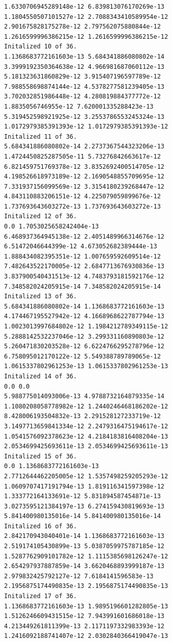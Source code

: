 \documentclass[11pt]{article}
\begin{document}
\begin{Verbatim}[commandchars=\\\{\}]
1.6330706945289148e-12 6.839813076170269e-13
1.1804550507101527e-12 2.7088343410589954e-12
2.901675828175278e-12 2.797562075880844e-12
1.2616599996386215e-12 1.2616599996386215e-12
Initalized 10 of 36.
1.1368683772161603e-13 5.684341886080802e-14
3.3999192350364638e-12 4.966981687060112e-13
5.181323631860829e-12 3.915407196597789e-12
7.988558698874144e-12 4.5378277581239405e-13
3.702032851986448e-12 4.280819884377772e-12
1.8835056746955e-12 7.620001335288423e-13
5.319452598921925e-12 3.2553786553245324e-13
1.0172979385391393e-12 1.0172979385391393e-12
Initalized 11 of 36.
5.684341886080802e-14 2.2737367544323206e-13
1.4724450825287505e-11 5.73276842663617e-12
6.821459751769378e-12 3.8352692400514705e-12
4.198526618973189e-12 2.1690548855709695e-12
7.331937156099569e-12 3.3154180239268447e-12
4.843110883206151e-12 4.225079059899676e-12
1.737693643603272e-13 1.737693643603272e-13
Initalized 12 of 36.
0.0 1.7053025658242404e-13
6.468937364945138e-12 2.4051489966314676e-12
6.51472046644399e-12 4.673052682389444e-13
1.888434082395351e-12 1.007659592609514e-12
7.482643522170005e-12 2.6847713676930836e-13
3.837900540431513e-12 4.7483793181592176e-12
7.348582024205915e-14 7.348582024205915e-14
Initalized 13 of 36.
5.684341886080802e-14 1.1368683772161603e-13
4.174467195527942e-12 4.1668968622787794e-13
1.0023013997684802e-12 1.1984212789349115e-12
5.2888142532237046e-12 3.299331160890803e-12
5.260471830203528e-12 6.6224766295278796e-12
6.758095012170122e-12 5.549388789789065e-12
1.0615337802961253e-13 1.0615337802961253e-13
Initalized 14 of 36.
0.0 0.0
5.988775014093006e-13 4.9788732164879335e-14
1.1080208058778982e-12 1.2440246468186202e-12
8.428006193504832e-13 2.291528127233719e-12
3.1497713659841334e-12 2.2479316475194617e-12
1.0541576092378623e-12 4.2184183816408204e-13
2.0534699425693611e-13 2.0534699425693611e-13
Initalized 15 of 36.
0.0 1.1368683772161603e-13
2.7712644462205005e-12 1.5357498259205293e-12
1.0609707417191794e-13 1.819116341597398e-12
1.333772164133691e-12 5.831894587454871e-13
3.0273595121384197e-13 6.274159430819693e-13
5.841400980135016e-14 5.841400980135016e-14
Initalized 16 of 36.
2.842170943040401e-14 1.1368683772161603e-13
2.519174105430899e-13 5.0387059975787185e-12
1.5287762909101782e-12 1.1115385698126247e-12
2.654297937887859e-14 3.6620468893999187e-13
2.979832425792127e-12 7.6184141596583e-13
2.1956875174490835e-13 2.1956875174490835e-13
Initalized 17 of 36.
1.1368683772161603e-13 1.9895196601282805e-13
1.5126246609431515e-12 7.943991601686018e-13
4.213449261811399e-13 2.1171197332983393e-12
1.2416092188741407e-12 2.0302840366419047e-13

\end{Verbatim}
\end{document}
